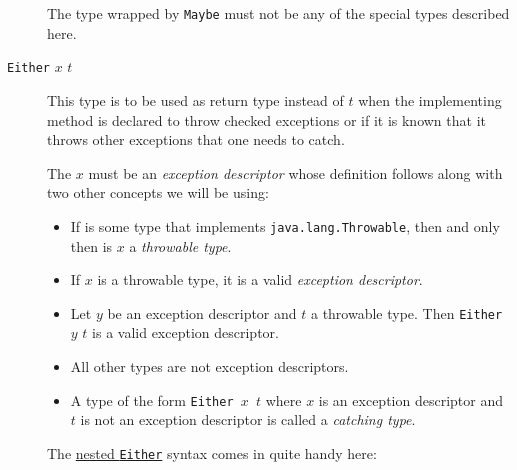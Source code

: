 \begin{description}
The type wrapped by \texttt{Maybe} must not be any of the special types described here.


\item[\texttt{Either} $x$ $t$] This type is to be used as return type instead of $t$ when the implementing method is declared to throw checked exceptions or if it is known that it throws other exceptions that one needs to catch.

The $x$ must be an \emph{exception descriptor} whose definition follows along with two other concepts we will be using:
\begin{itemize}
\item If  is some \java{} type that implements \texttt{java.lang.Throwable}, then and only then is $x$ a \emph{throwable type}. \label{throwable}
\item If $x$ is a throwable type, it is a valid \emph{exception descriptor}. \label{descriptor}
\item Let $y$ be an exception descriptor and $t$ a throwable type. 
Then \texttt{Either} $y$ $t$  is a valid exception descriptor.
\item All other types are not exception descriptors.
\item A type of the form \texttt{Either $x$ $t$} 
where $x$ is an exception descriptor and $t$ is not an exception descriptor is called a \emph{catching type}.
\label{catching}
\end{itemize}

The \hyperref[nested-either]{nested \texttt{Either}} syntax comes in quite handy here:



\end{description}
